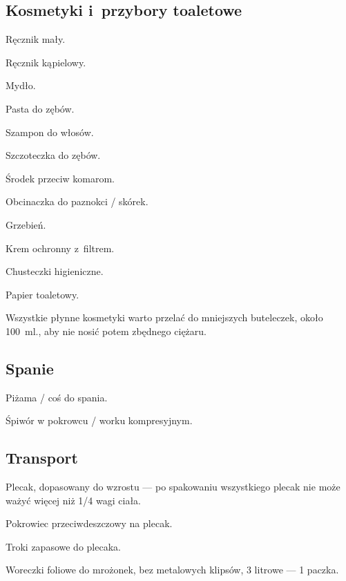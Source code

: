 \subsection{Kosmetyki i~przybory toaletowe}
\begin{checklist}
\item Ręcznik mały.
\item Ręcznik kąpielowy.
\item Mydło.
\item Pasta do zębów.
\item Szampon do włosów.
\item Szczoteczka do zębów.
\item Środek przeciw komarom.
\item Obcinaczka do paznokci / skórek.
\item Grzebień.
\item Krem ochronny z~filtrem.
\item Chusteczki higieniczne.
\item Papier toaletowy.
\end{checklist}
Wszystkie płynne kosmetyki warto przelać do mniejszych buteleczek, około 100~ml., aby nie nosić potem zbędnego ciężaru.

\subsection{Spanie}
\begin{checklist}
\item Piżama / coś do spania.
\item Śpiwór w pokrowcu / worku kompresyjnym.
\end{checklist}

\subsection{Transport}
\begin{checklist}
\item Plecak, dopasowany do wzrostu --- po spakowaniu wszystkiego plecak nie może ważyć więcej niż 1/4 wagi ciała.
\item Pokrowiec przeciwdeszczowy na plecak.
\item Troki zapasowe do plecaka.
\item Woreczki foliowe do mrożonek, bez metalowych klipsów, 3 litrowe --- 1 paczka.
\end{checklist}

